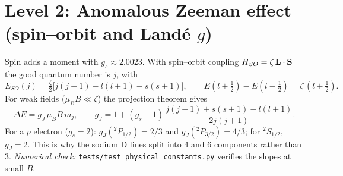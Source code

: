 \section{Level 2: Anomalous Zeeman effect (spin--orbit and Land\'e $g$)}
Spin adds a moment with $g_s \approx 2.0023$. With spin--orbit coupling
$H_{SO} = \zeta\,\vb{L}\cdot\vb{S}$ the good quantum number is $j$, with
\begin{equation}
  E_{SO}(j) = \tfrac{\zeta}{2}\big[j(j+1) - l(l+1) - s(s+1)\big],
  \qquad E(l+\tfrac12) - E(l-\tfrac12) = \zeta\,(l+\tfrac12).
\end{equation}
For weak fields ($\mu_B B \ll \zeta$) the projection theorem gives
\begin{equation}
  \Delta E = g_J\, \mu_B B\, m_j, \qquad
  g_J = 1 + (g_s - 1)\,\frac{j(j+1) + s(s+1) - l(l+1)}{2j(j+1)} .
\end{equation}
For a $p$ electron ($g_s=2$): $g_J(^2P_{1/2}) = 2/3$ and $g_J(^2P_{3/2}) = 4/3$; for $^2S_{1/2}$,
$g_J = 2$. This is why the sodium D lines split into 4 and 6 components rather than 3.
\emph{Numerical check:} \texttt{tests/test\_physical\_constants.py} verifies the slopes at small $B$.
